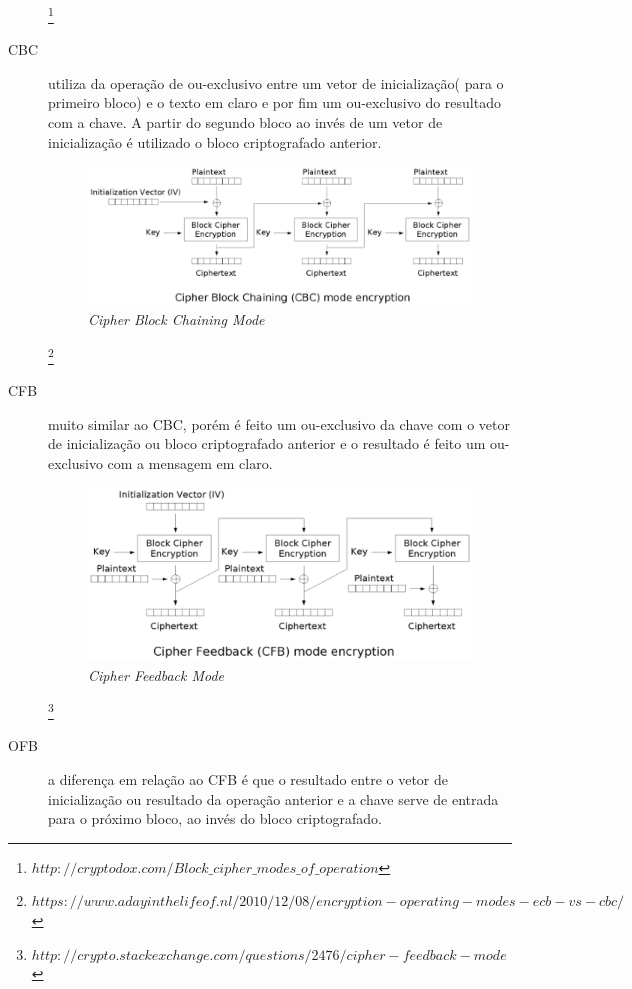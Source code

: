 \begin{description}
\begin{figure}[h]
\end{figure} \footnote{$http://cryptodox.com/Block\_cipher\_modes\_of\_operation$}
\item[CBC] utiliza da operação de ou-exclusivo entre um vetor de inicialização( para o primeiro bloco) e o texto em claro e por fim um ou-exclusivo do resultado com a chave. A partir do segundo bloco ao invés de um vetor de inicialização é utilizado o bloco criptografado anterior.
\begin{figure}[h]
\centering
\includegraphics[keepaspectratio=true,scale=0.7]
    {figuras/cbc.eps}
    \caption{\textit{Cipher Block Chaining Mode}}
\end{figure} \footnote{$https://www.adayinthelifeof.nl/2010/12/08/encryption-operating-modes-ecb-vs-cbc/$}
\item[CFB] muito similar ao CBC, porém é feito um ou-exclusivo da chave com o vetor de inicialização ou bloco criptografado anterior e o resultado é feito um ou-exclusivo com a mensagem em claro.
\begin{figure}[h]
\centering
\includegraphics[keepaspectratio=true,scale=0.7]
    {figuras/cfb.eps}
    \caption{\textit{Cipher Feedback Mode } } 
\end{figure}\footnote{$http://crypto.stackexchange.com/questions/2476/cipher-feedback-mode$}
\item[OFB] a diferença em relação ao CFB é que o resultado entre o vetor de inicialização ou resultado da operação anterior e a chave serve de entrada para o próximo bloco, ao invés do bloco criptografado.

\end{description}
